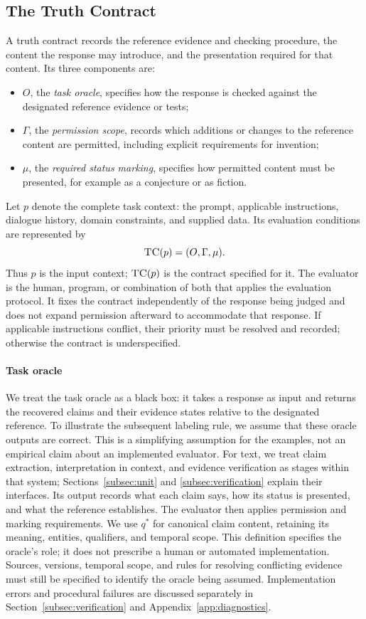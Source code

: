 \documentclass{clv2025}
\newcommand{\TC}{\textsc{TC}}
\begin{document}
\subsection{The Truth Contract}\label{subsec:contract}
A truth contract records the reference evidence and checking procedure,
the content the response may introduce, and the presentation required for
that content. Its three components are:
\begin{itemize}
\item $O$, the \emph{task oracle}, specifies how the response is checked
against the designated reference evidence or tests;
\item $\Gamma$, the \emph{permission scope}, records which additions or
changes to the reference content are permitted, including explicit
requirements for invention;
\item $\mu$, the \emph{required status marking}, specifies how permitted
content must be presented, for example as a conjecture or as fiction.
\end{itemize}
Let $p$ denote the complete task context: the prompt, applicable instructions,
dialogue history, domain constraints, and supplied data. Its evaluation
conditions are represented by
\begin{equation}
\TC(p)=(O,\Gamma,\mu).
\label{eq:truth-contract}
\end{equation}
Thus $p$ is the input context; $\TC(p)$ is the contract specified for it.
The evaluator is the human, program, or combination of both that applies
the evaluation protocol. It fixes the contract independently of the response
being judged and does not expand permission afterward to accommodate that
response. If applicable instructions conflict, their priority must be
resolved and recorded; otherwise the contract is underspecified.

\paragraph{Task oracle}
We treat the task oracle as a black box: it takes a response as input and
returns the recovered claims and their evidence states relative to the
designated reference. To illustrate the subsequent labeling rule, we assume
that these oracle outputs are correct. This is a simplifying assumption for
the examples, not an empirical claim about an implemented evaluator.
For text, we treat
claim extraction, interpretation in context, and evidence verification as
stages within that system; Sections~\ref{subsec:unit} and
\ref{subsec:verification} explain their interfaces. Its output records what
each claim says, how its status is presented, and what the reference
establishes. The evaluator then applies permission and marking requirements.
We use $q^*$ for canonical claim content, retaining its meaning, entities,
qualifiers, and temporal scope. This definition specifies the oracle's role;
it does not prescribe a human or automated implementation. Sources,
versions, temporal scope, and rules for resolving conflicting evidence must
still be specified to identify the oracle being assumed. Implementation
errors and procedural failures are discussed separately in
Section~\ref{subsec:verification} and Appendix~\ref{app:diagnostics}.
\end{document}
